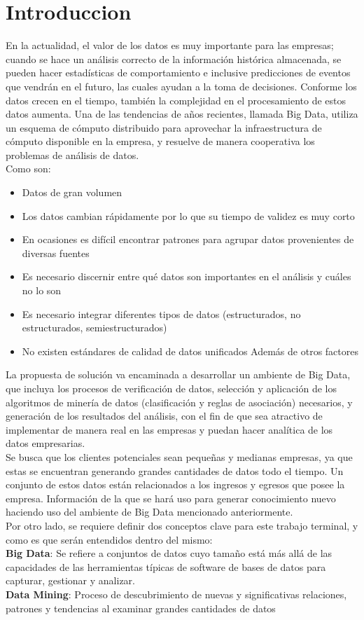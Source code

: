 \hypertarget{seccion:IniciarSesion}{\vspace{1pt}}
\section{Introduccion}
En la actualidad, el valor de los datos es muy importante para las empresas; cuando se hace un análisis correcto de la información
histórica almacenada, se pueden hacer estadísticas de comportamiento e inclusive predicciones de eventos que vendrán en el futuro, las cuales ayudan a la toma
de decisiones. Conforme los datos crecen en el tiempo, también la complejidad en el procesamiento de estos datos aumenta.
Una de las tendencias de años recientes, llamada Big Data, utiliza un esquema de cómputo distribuido para aprovechar la
infraestructura de cómputo disponible en la empresa, y resuelve de manera cooperativa los problemas de análisis de datos.
\\
Como son:
\begin{itemize}
\item Datos de gran volumen 
\item Los datos cambian rápidamente por lo que su tiempo de validez es muy corto
\item En ocasiones es difícil encontrar patrones para agrupar datos provenientes de diversas fuentes 
\item Es necesario discernir entre qué datos son importantes en el análisis y cuáles no lo son 
\item Es necesario integrar diferentes tipos de datos (estructurados, no estructurados, semiestructurados) 
\item No existen estándares de calidad de datos unificados
Además de otros factores 
\end{itemize}
La propuesta de solución va encaminada a desarrollar un ambiente de Big Data, que incluya los procesos de verificación de datos,
selección y aplicación de los algoritmos de minería de datos (clasificación y reglas de asociación) necesarios, y generación de los
resultados del análisis, con el fin de que sea atractivo de implementar de manera real en las empresas y puedan hacer analítica de
los datos empresarias.
\\
Se busca que los clientes potenciales sean pequeñas y medianas empresas, ya que estas se encuentran generando grandes
cantidades de datos todo el tiempo. Un conjunto de estos datos están relacionados a los ingresos y egresos que posee la empresa.
Información de la que se hará uso para generar conocimiento nuevo haciendo uso del ambiente de Big Data mencionado
anteriormente.
\\
Por otro lado, se requiere definir dos conceptos clave para este trabajo terminal, y como es que serán entendidos dentro del mismo:
\\
\textbf{Big Data}: Se refiere a conjuntos de datos cuyo tamaño está más allá de las capacidades de las herramientas típicas de software de
bases de datos para capturar, gestionar y analizar.
\\
\textbf{Data Mining}: Proceso de descubrimiento de nuevas y significativas relaciones, patrones y tendencias al examinar grandes
cantidades de datos
